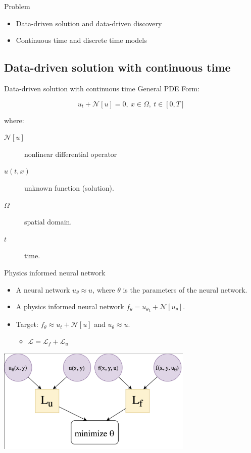 \documentclass[aspectratio=1610,xcolor={dvipsnames},hyperref={colorlinks,unicode,linkcolor=violet,anchorcolor=BlueViolet,citecolor=YellowOrange,filecolor=black,urlcolor=Aquamarine}]{beamer}
\begin{document}
\begin{frame}[label={sec:orgac712d9}]{Problem}
\begin{itemize}
\item Data-driven solution and data-driven discovery
\item Continuous time and discrete time models
\end{itemize}
\end{frame}

\subsection{Data-driven solution with continuous time}
\label{sec:org3c1b7dc}

\begin{frame}[label={sec:org672ff1b}]{Data-driven solution with continuous time}
General PDE Form:

\[u_t + \mathcal{N}[u] = 0,\ x \in \Omega, \ t\in[0,T]\]

where:
\begin{description}
\item[{\(\mathcal{N}[u]\)}] nonlinear differential operator
\item[{\(u(t, x)\)}] unknown function (solution).
\item[{\(\Omega\)}] spatial domain.
\item[{\(t\)}] time.
\end{description}
\end{frame}

\begin{frame}[label={sec:orgde2178e}]{Physics informed neural network}
\begin{itemize}
\item A neural network \(u_{\theta} \approx u\), where \(\theta\) is the parameters of the neural network.
\item A \alert{physics informed neural network} \(f_{\theta} = {u_{\theta}}_{t} + \mathcal{N}[u_{\theta}]\).
\item Target: \(f_{\theta} \approx u_{t} + \mathcal{N}[u]\) and \(u_{\theta} \approx u\).
\begin{itemize}
\item \(\mathcal{L} = \mathcal{L}_{f} + \mathcal{L}_{u}\)
\end{itemize}
\end{itemize}

\begin{center}
\includegraphics[height=5cm]{./p6.png}
\end{center}
\end{frame}
\end{document}

